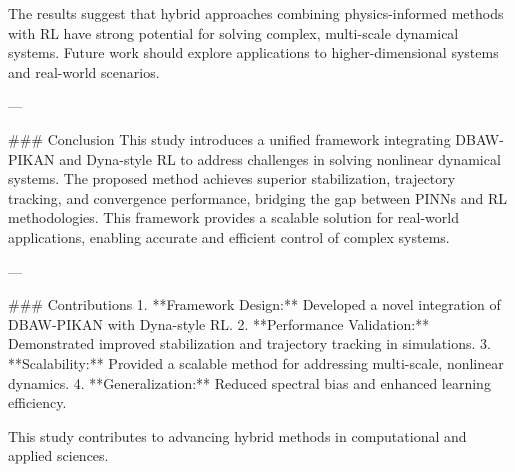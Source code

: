 The results suggest that hybrid approaches combining physics-informed methods with RL have strong potential for solving complex, multi-scale dynamical systems. Future work should explore applications to higher-dimensional systems and real-world scenarios.

---

### Conclusion
This study introduces a unified framework integrating DBAW-PIKAN and Dyna-style RL to address challenges in solving nonlinear dynamical systems. The proposed method achieves superior stabilization, trajectory tracking, and convergence performance, bridging the gap between PINNs and RL methodologies. This framework provides a scalable solution for real-world applications, enabling accurate and efficient control of complex systems.

---

### Contributions
1. **Framework Design:** Developed a novel integration of DBAW-PIKAN with Dyna-style RL.
2. **Performance Validation:** Demonstrated improved stabilization and trajectory tracking in simulations.
3. **Scalability:** Provided a scalable method for addressing multi-scale, nonlinear dynamics.
4. **Generalization:** Reduced spectral bias and enhanced learning efficiency.

This study contributes to advancing hybrid methods in computational and applied sciences.